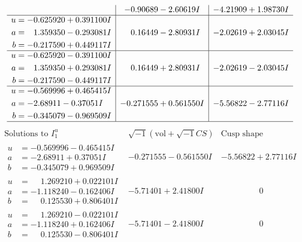 \documentclass[1p]{elsarticle_modified}
\theoremstyle{definition}
\newcommand{\I}{\sqrt{-1}}
\begin{document}
$$\begin{array}{c|c|c}
 & -0.90689 - 2.60619 I & -4.21909 + 1.98730 I \\ \hline\begin{aligned}
u &= -0.625920 + 0.391100 I \\
a &= \phantom{-}1.359350 - 0.293081 I \\
b &= -0.217590 + 0.449117 I\end{aligned}
 & \phantom{-}0.16449 - 2.80931 I & -2.02619 + 2.03045 I \\ \hline\begin{aligned}
u &= -0.625920 - 0.391100 I \\
a &= \phantom{-}1.359350 + 0.293081 I \\
b &= -0.217590 - 0.449117 I\end{aligned}
 & \phantom{-}0.16449 + 2.80931 I & -2.02619 - 2.03045 I \\ \hline\begin{aligned}
u &= -0.569996 + 0.465415 I \\
a &= -2.68911 - 0.37051 I \\
b &= -0.345079 - 0.969509 I\end{aligned}
 & -0.271555 + 0.561550 I & -5.56822 - 2.77116 I\\
 \hline 
 \end{array}$$\newpage$$\begin{array}{c|c|c}  
\text{Solutions to }I^u_{1}& \I (\text{vol} + \sqrt{-1}CS) & \text{Cusp shape}\\
 \hline 
\begin{aligned}
u &= -0.569996 - 0.465415 I \\
a &= -2.68911 + 0.37051 I \\
b &= -0.345079 + 0.969509 I\end{aligned}
 & -0.271555 - 0.561550 I & -5.56822 + 2.77116 I \\ \hline\begin{aligned}
u &= \phantom{-}1.269210 + 0.022101 I \\
a &= -1.118240 - 0.162406 I \\
b &= \phantom{-}0.125530 + 0.806401 I\end{aligned}
 & -5.71401 + 2.41800 I & \phantom{-0.000000 } 0 \\ \hline\begin{aligned}
u &= \phantom{-}1.269210 - 0.022101 I \\
a &= -1.118240 + 0.162406 I \\
b &= \phantom{-}0.125530 - 0.806401 I\end{aligned}
 & -5.71401 - 2.41800 I & \phantom{-0.000000 } 0 \\ \hline\begin{aligned}

\end{aligned}
\end{array}$$
\end{document}
